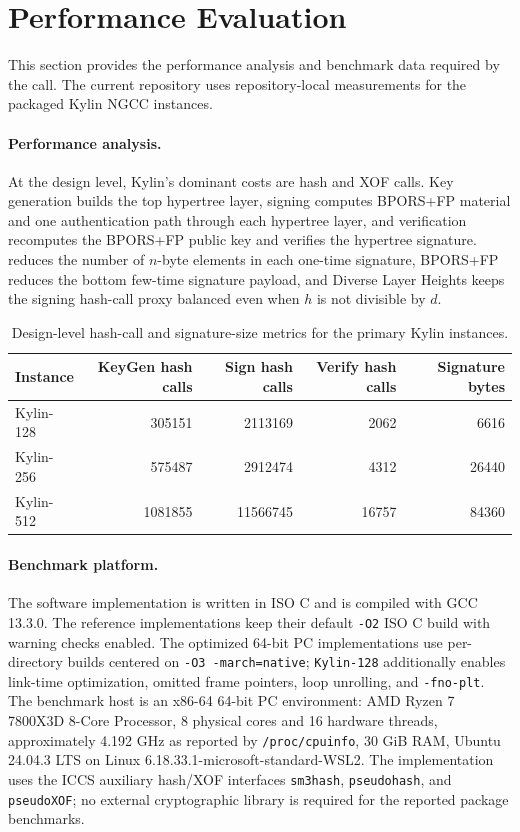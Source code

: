 \section{Performance Evaluation}
\label{sec:performance}

This section provides the performance analysis and benchmark data required by the call. The current repository uses repository-local measurements for the packaged Kylin NGCC instances.

\paragraph{Performance analysis.}
At the design level, Kylin's dominant costs are hash and XOF calls. Key generation builds the top hypertree layer, signing computes BPORS+FP material and one authentication path through each hypertree layer, and verification recomputes the BPORS+FP public key and verifies the hypertree signature. \WOTSCS reduces the number of $n$-byte elements in each one-time signature, BPORS+FP reduces the bottom few-time signature payload, and Diverse Layer Heights keeps the signing hash-call proxy balanced even when $h$ is not divisible by $d$.

\begin{table}[H]
    \centering
    \caption{Design-level hash-call and signature-size metrics for the primary Kylin instances.}
    \label{tab:kylin-hashcall-performance}
    \scriptsize
    \begin{tabular}{l r r r r}
    \toprule
    Instance & KeyGen hash calls & Sign hash calls & Verify hash calls & Signature bytes \\ \midrule
    Kylin-128 & 305151 & 2113169 & 2062 & 6616 \\
    Kylin-256 & 575487 & 2912474 & 4312 & 26440 \\
    Kylin-512 & 1081855 & 11566745 & 16757 & 84360 \\
    \bottomrule
    \end{tabular}
\end{table}

\paragraph{Benchmark platform.}
The software implementation is written in ISO C and is compiled with GCC 13.3.0. The reference implementations keep their default \texttt{-O2} ISO C build with warning checks enabled. The optimized 64-bit PC implementations use per-directory builds centered on \texttt{-O3 -march=native}; \texttt{Kylin-128} additionally enables link-time optimization, omitted frame pointers, loop unrolling, and \texttt{-fno-plt}. The benchmark host is an x86-64 64-bit PC environment: AMD Ryzen 7 7800X3D 8-Core Processor, 8 physical cores and 16 hardware threads, approximately 4.192 GHz as reported by \texttt{/proc/cpuinfo}, 30 GiB RAM, Ubuntu 24.04.3 LTS on Linux 6.18.33.1-microsoft-standard-WSL2. The implementation uses the ICCS auxiliary hash/XOF interfaces \texttt{sm3hash}, \texttt{pseudohash}, and \texttt{pseudoXOF}; no external cryptographic library is required for the reported package benchmarks.

